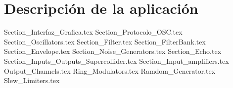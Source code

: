 \chapter{Descripción de la aplicación}

	{Section_Interfaz_Grafica.tex}
	{Section_Protocolo_OSC.tex}
	{Section_Oscillators.tex}
	{Section_Filter.tex}	
	{Section_FilterBank.tex}	
	{Section_Envelope.tex}	
	{Section_Noise_Generators.tex}
	{Section_Echo.tex}
	{Section_Inputs_Outputs_Supercollider.tex}
	{Section_Input_amplifiers.tex}
	{Output_Channels.tex}
	{Ring_Modulators.tex}
	{Ramdom_Generator.tex}
	{Slew_Limiters.tex}
